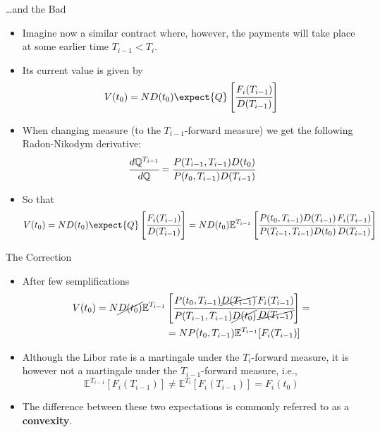 \documentclass{beamer}
\begin{document}
\begin{frame}{\ldots and the Bad}
\begin{itemize}
\item<1-> Imagine now a similar contract where, however, the payments will take place at some earlier time $T_{i-1} < T_i$. \item<2->Its current value is given by
\begin{equation*}
V(t_0) = N D(t_0)\expect{Q}\left[\cfrac{F_i(T_{i-1})}{D(T_{i-1})}\right]
\end{equation*}
\item<3-> When changing measure (to the $T_{i-1}$-forward measure) we get the following Radon-Nikodym derivative:
\begin{equation*}
\cfrac{d\mathbb{Q}^{T_{i-1}}}{d\mathbb{Q}}=\cfrac{P(T_{i-1},T_{i-1})D(t_0)}{P(t_0,T_{i-1})D(T_{i-1})}
\end{equation*}
\item<4->So that
\begin{equation*}
V(t_0) = N D(t_0)\expect{Q}\left[\cfrac{F_i(T_{i-1})}{D(T_{i-1})}\right] = N D(t_0)\mathbb{E}^{T_{i-1}}\left[\cfrac{P(t_0,T_{i-1})D(T_{i-1})}{P(T_{i-1},T_{i-1})D(t_0)}\cfrac{F_i(T_{i-1})}{D(T_{i-1})}\right] 
\end{equation*}
\end{itemize}
\end{frame}

\begin{frame}{The Correction}
\begin{itemize}
\item<1-> After few semplifications
\begin{equation*}
\begin{aligned}
V(t_0) = N \cancel{D(t_0)}\mathbb{E}^{T_{i-1}}&\left[\cfrac{P(t_0,T_{i-1})\cancel{D(T_{i-1})}}{P(T_{i-1},T_{i-1})\cancel{D(t_0)}}\cfrac{F_i(T_{i-1})}{\cancel{D(T_{i-1})}}\right] = \\
&= N P(t_0,T_{i-1})\mathbb{E}^{T_{i-1}}[F_i(T_{i-1})]
\end{aligned}
\end{equation*}
\item<1-> Although the Libor rate is a martingale under the $T_i$-forward
measure, it is however not a martingale under the $T_{i-1}$-forward measure, i.e.,
\begin{equation*}
	\mathbb{E}^{T_{i-1}}\left[F_i(T_{i-1})\right]\neq \mathbb{E}^{T_i}\left[F_i(T_{i-1})\right] = F_i(t_0)
\end{equation*}
\item<2-> The difference between these two expectations is commonly referred to as a \textbf{convexity}.
\end{itemize}
\end{frame}
\end{document}
